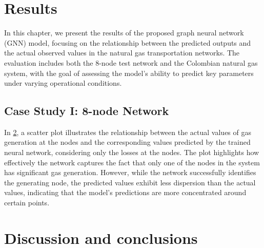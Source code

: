 \section{Results}


In this chapter, we present the results of the proposed graph neural network (GNN) model, focusing on the relationship between the predicted outputs and the actual observed values in the natural gas transportation networks. The evaluation includes both the 8-node test network and the Colombian natural gas system, with the goal of assessing the model's ability to predict key parameters under varying operational conditions. 


%
%     
%

\subsection{Case Study I: 8-node Network}


In \cref{fig:results_dummy_base}, a scatter plot illustrates the relationship between the actual values of gas generation at the nodes and the corresponding values predicted by the trained neural network, considering only the losses at the nodes. The plot highlights how effectively the network captures the fact that only one of the nodes in the system has significant gas generation. However, while the network successfully identifies the generating node, the predicted values exhibit less dispersion than the actual values, indicating that the model's predictions are more concentrated around certain points.
%
\begin{figure}
    \centering
    \setlength{}        
    \setlength{}
    \resizebox{\figurewidth}{\figureheight}{}
    \caption{}\label{fig:results_dummy_base}
\end{figure}

\begin{figure}
    \centering
    \setlength{}        
    \setlength{}
    \resizebox{\figurewidth}{\figureheight}{}
    \caption{}\label{fig:results_dummy_base}
\end{figure}







\section{Discussion and conclusions}
